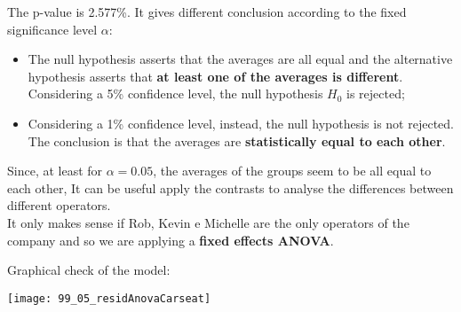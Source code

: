 \begin{frame}
  \vspace{0.75cm}
  The p-value is 2.577\%.  It gives different conclusion according to the fixed significance level $ \alpha $:
  \vspace{0.5cm}
  \begin{itemize}
    \item The null hypothesis asserts that the averages are all equal and the alternative hypothesis asserts that \textbf{at least one of the averages is different}. Considering a 5\% confidence level, the null hypothesis $ H_0 $ is rejected;
    \vspace{0.5cm}
    \item Considering a 1\% confidence level, instead, the null hypothesis is not rejected. The conclusion is that the averages are  \textbf{statistically equal to each other}.
  \end{itemize}
\end{frame}

\begin{frame}
  \vspace{1cm}
  Since, at least for $ \alpha = 0.05 $, the averages of the groups seem to be all equal to each other, It can be useful apply the contrasts to analyse the differences between different operators.\\ 
  \vspace{1cm}
  It only makes sense if Rob, Kevin e Michelle are the only operators of the company and so we are applying a \textbf{fixed effects ANOVA}.
\end{frame}

\begin{frame}
  Graphical check of the model:\\
  \vspace{.1cm}
  \begin{center}
    \texttt{[image: 99\_05\_residAnovaCarseat]}
    \end{center}
\end{frame}


